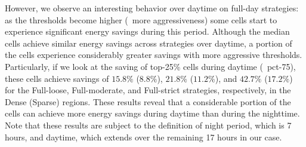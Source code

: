 However, we observe an interesting behavior over daytime on full-day strategies: as the thresholds become higher (\ie~more aggressiveness) some cells start to experience significant energy savings during this period. Although the median cells achieve similar energy savings across strategies over daytime, a portion of the cells experience considerably greater savings with more aggressive thresholds. Particularly, if we look at the saving of top-25\% cells during daytime (\ie~pct-75), these cells achieve savings of $15.8\%$ ($8.8\%$), $21.8\%$ ($11.2\%$), and $42.7\%$ ($17.2\%$) 
for the Full-loose, Full-moderate, and Full-strict strategies, respectively, in the Dense (Sparse) regions. These results reveal that a considerable portion of the cells can achieve more energy savings during daytime than during the nighttime. Note that these results are subject to the definition of night period, which is 7 hours, and daytime, which extends over the remaining 17 hours in our case.